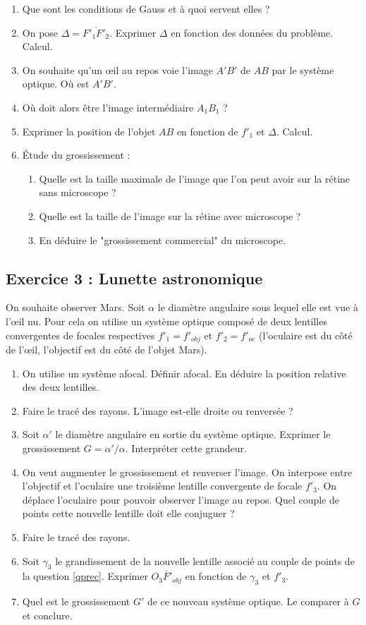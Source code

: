 \begin{enumerate}
	\item Que sont les conditions de Gauss et à quoi servent elles ?
	\item On pose $\Delta = \overline{F'_1F'_2}$. Exprimer $\Delta$ en fonction des données du problème. Calcul.
	\item On souhaite qu'un œil au repos voie l'image $A'B'$ de $AB$ par le système optique. Où est $A'B'$.
	\item Où doit alors être l'image intermédiaire $A_1B_1$ ?
	\item Exprimer la position de l'objet $AB$ en fonction de $f'_1$ et $\Delta$. Calcul.
	\item Étude du grossissement :
	\begin{enumerate}
		\item Quelle est la taille maximale de l'image que l'on peut avoir sur la rétine sans microscope ?
		\item Quelle est la taille de l'image sur la rétine avec microscope ?
		\item En déduire le "grossissement commercial" du microscope.
	\end{enumerate}
\end{enumerate}

\subsection{Exercice 3 : Lunette astronomique}

On souhaite observer Mars. Soit $\alpha$ le diamètre angulaire sous lequel elle est vue à l'œil nu. Pour cela on utilise un système optique composé de deux lentilles convergentes de focales respectives $f'_1=f'_{obj}$ et $f'_2=f'_{oc}$ (l'oculaire est du côté de l'œil, l'objectif est du côté de l'objet Mars).

\begin{enumerate}
	\item On utilise un système afocal. Définir afocal. En déduire la position relative des deux lentilles.
	\item Faire le tracé des rayons. L'image est-elle droite ou renversée ?
	\item Soit $\alpha'$ le diamètre angulaire en sortie du système optique. Exprimer le grossissement $G = \alpha'/\alpha$. Interpréter cette grandeur.
	\item \label{qprec} On veut augmenter le grossissement et renverser l'image. On interpose entre l'objectif et l'oculaire une troisième lentille convergente de focale $f'_3$. On déplace l'oculaire pour pouvoir observer l'image au repos. Quel couple de points cette nouvelle lentille doit elle conjuguer ?
	\item Faire le tracé des rayons.
	\item Soit $\gamma_3$ le grandissement de la nouvelle lentille associé au couple de points de la question \ref{qprec}. Exprimer $\overline{O_3F'_{obj}}$ en fonction de $\gamma_3$ et $f'_3$.
	\item Quel est le grossissement $G'$ de ce nouveau système optique. Le comparer à $G$ et conclure.
\end{enumerate}
